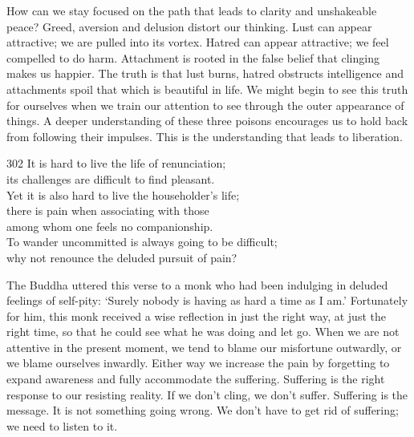 \begin{dhpRefl}
How can we stay focused on the path that leads to clarity and unshakeable peace? Greed, aversion and delusion distort our thinking. Lust can appear attractive; we are pulled into its vortex. Hatred can appear attractive; we feel compelled to do harm. Attachment is rooted in the false belief that clinging makes us happier. The truth is that lust burns, hatred obstructs intelligence and attachments spoil that which is beautiful in life. We might begin to see this truth for ourselves when we train our attention to see through the outer appearance of things. A deeper understanding of these three poisons encourages us to hold back from following their impulses. This is the understanding that leads to liberation.
\end{dhpRefl}


\begin{dhpVerse}{302}
\label{dhp-302}
It is hard to live the life of renunciation;\\
its challenges are difficult to find pleasant.\\
Yet it is also hard to live the householder's life;\\
there is pain when associating with those\\
among whom one feels no companionship.\\
To wander uncommitted is always going to be difficult;\\
why not renounce the deluded pursuit of pain?
\end{dhpVerse}

\begin{dhpRefl}
The Buddha uttered this verse to a monk who had been indulging in deluded feelings of self-pity: `Surely nobody is having as hard a time as I am.' Fortunately for him, this monk received a wise reflection in just the right way, at just the right time, so that he could see what he was doing and let go. When we are not attentive in the present moment, we tend to blame our misfortune outwardly, or we blame ourselves inwardly. Either way we increase the pain by forgetting to expand awareness and fully accommodate the suffering. Suffering is the right response to our resisting reality. If we don't cling, we don't suffer. Suffering is the message. It is not something going wrong. We don't have to get rid of suffering; we need to listen to it.
\end{dhpRefl}


